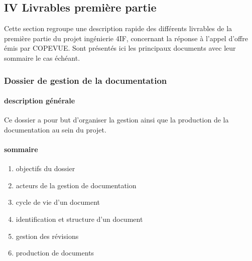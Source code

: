 \documentclass{article}
\begin{document}
\subsection[]{}
\subsection[]{}
\subsection[]{}
\subsection[]{}
\subsection[]{}
\subsection[]{}
\subsection[IV Livrables première partie]{IV Livrables première partie}
Cette section regroupe une description rapide des différents livrables
de la première partie du projet ingénierie 4IF, concernant la réponse à
l’appel d’offre émis par COPEVUE. Sont présentés ici les principaux
documents avec leur sommaire le cas échéant.

\subsubsection[Dossier de gestion de la documentation]{Dossier de
gestion de la documentation}
\paragraph[description générale]{description générale}
Ce dossier a pour but d’organiser la gestion ainsi que la production de
la documentation au sein du projet.

\paragraph[sommaire]{sommaire}
\begin{enumerate}
\item objectifs du dossier
\item acteurs de la gestion de documentation
\item cycle de vie d’un document
\item identification et structure d’un document
\item gestion des révisions
\item production de documents
\end{enumerate}
\end{document}
